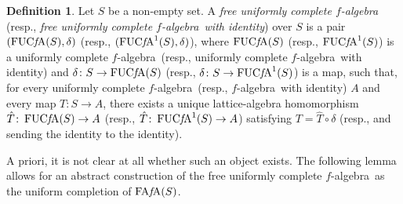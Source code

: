 \documentclass{amsart}
\theoremstyle{plain}
\theoremstyle{definition}
\newtheorem{defn}[thm]{Definition}
\theoremstyle{remark}
\newcommand{\falg}{$f\!$-algebra}
\newcommand{\FAFA}[1]{\operatorname{FA{\it f}\!A}(#1)}
\newcommand{\FUCFA}[1]{\operatorname{FUC{\it f}\!A}(#1)}
\newcommand{\uFUCFA}[1]{\operatorname{FUC{\it f}\!A}^1(#1)}
\begin{document}
\begin{defn}
    Let $S$ be a non-empty set. A \emph{free uniformly complete \falg}
    (resp., \emph{free uniformly complete \falg\ with identity})
    over $S$ is a pair $(\FUCFA S, \delta )$ (resp., $(\uFUCFA S,\delta
    )$), where $\FUCFA S$ (resp., $\uFUCFA S$) is a
    uniformly complete \falg\ (resp., uniformly complete \falg\ with identity) and
    $\delta \colon S\to \FUCFA S$ (resp., $\delta \colon S\to \uFUCFA S$) is a
    map, such that, for every uniformly complete \falg\ (resp., \falg\ with
    identity) $A$ and every
    map $T\colon S\to A$, there exists a unique lattice-algebra
    homomorphism $\hat{T}\colon \FUCFA S\to A$ (resp., $\hat{T}\colon
    \uFUCFA S\to A$) satisfying $T=\hat{T}\circ \delta $ (resp., and
    sending the identity to the identity).
\end{defn}

A priori, it is not clear at all whether such an object exists. The
following lemma allows for an abstract construction of the free
uniformly complete \falg\ as the uniform completion of $\FAFA S$.
\end{document}
